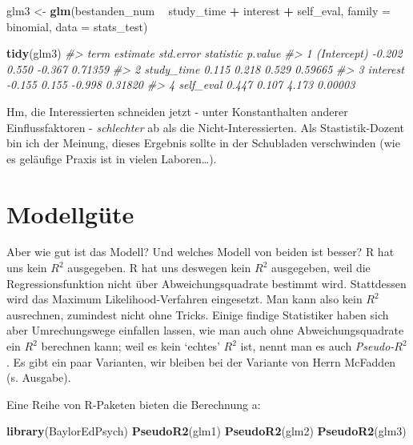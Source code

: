 \documentclass[12pt,ngerman,]{book}
\makeatletter
\newenvironment{Shaded}{\begin{snugshade}}{\end{snugshade}}
\newcommand{\KeywordTok}[1]{\textcolor[rgb]{0.13,0.29,0.53}{\textbf{#1}}}
\newcommand{\DataTypeTok}[1]{\textcolor[rgb]{0.13,0.29,0.53}{#1}}
\newcommand{\StringTok}[1]{\textcolor[rgb]{0.31,0.60,0.02}{#1}}
\newcommand{\CommentTok}[1]{\textcolor[rgb]{0.56,0.35,0.01}{\textit{#1}}}
\newcommand{\OperatorTok}[1]{\textcolor[rgb]{0.81,0.36,0.00}{\textbf{#1}}}
\newcommand{\NormalTok}[1]{#1}
\newenvironment{kframe}{%
\medskip{}
\setlength{\fboxsep}{.8em}
 \def\at@end@of@kframe{}%
 \ifinner\ifhmode%
  \def\at@end@of@kframe{\end{minipage}}%
  \begin{minipage}{\columnwidth}%
 \fi\fi%
 \def\FrameCommand##1{\hskip\@totalleftmargin \hskip-\fboxsep
 \colorbox{shadecolor}{##1}\hskip-\fboxsep
     \hskip-\linewidth \hskip-\@totalleftmargin \hskip\columnwidth}%
 \MakeFramed {\advance\hsize-\width
   \@totalleftmargin\z@ \linewidth\hsize
   \@setminipage}}%
 {\par\unskip\endMakeFramed%
 \at@end@of@kframe}
\renewenvironment{Shaded}{\begin{kframe}}{\end{kframe}}
\theoremstyle{definition}
\theoremstyle{definition}
\theoremstyle{remark}
\makeatother
\begin{document}
\begin{Shaded}
\begin{Highlighting}[]
\NormalTok{glm3 <-}\StringTok{ }\KeywordTok{glm}\NormalTok{(bestanden_num }\OperatorTok{~}\StringTok{ }\NormalTok{study_time }\OperatorTok{+}\StringTok{ }\NormalTok{interest }\OperatorTok{+}\StringTok{ }\NormalTok{self_eval, }
            \DataTypeTok{family =}\NormalTok{ binomial, }
            \DataTypeTok{data =}\NormalTok{ stats_test)}

\KeywordTok{tidy}\NormalTok{(glm3)}
\CommentTok{#>          term estimate std.error statistic p.value}
\CommentTok{#> 1 (Intercept)   -0.202     0.550    -0.367 0.71359}
\CommentTok{#> 2  study_time    0.115     0.218     0.529 0.59665}
\CommentTok{#> 3    interest   -0.155     0.155    -0.998 0.31820}
\CommentTok{#> 4   self_eval    0.447     0.107     4.173 0.00003}
\end{Highlighting}
\end{Shaded}

Hm, die Interessierten schneiden jetzt - unter Konstanthalten anderer
Einflussfaktoren - \emph{schlechter} ab als die Nicht-Interessierten.
Als Stastistik-Dozent bin ich der Meinung, dieses Ergebnis sollte in der
Schubladen verschwinden (wie es geläufige Praxis ist in vielen
Laboren\ldots{}).

\section{Modellgüte}\label{Modellguete}

Aber wie gut ist das Modell? Und welches Modell von beiden ist besser? R
hat uns kein \(R^2\) ausgegeben. R hat uns deswegen kein \(R^2\)
ausgegeben, weil die Regressionsfunktion nicht über Abweichungsquadrate
bestimmt wird. Stattdessen wird das Maximum Likelihood-Verfahren
eingesetzt. Man kann also kein \(R^2\) ausrechnen, zumindest nicht ohne
Tricks. Einige findige Statistiker haben sich aber Umrechungswege
einfallen lassen, wie man auch ohne Abweichungsquadrate ein \(R^2\)
berechnen kann; weil es kein `echtes' \(R^2\) ist, nennt man es auch
\emph{Pseudo-}\(R^2\). Es gibt ein paar Varianten, wir bleiben bei der
Variante von Herrn McFadden (s. Ausgabe).

Eine Reihe von R-Paketen bieten die Berechnung a:

\begin{Shaded}
\begin{Highlighting}[]
\KeywordTok{library}\NormalTok{(BaylorEdPsych)}
\KeywordTok{PseudoR2}\NormalTok{(glm1)}
\KeywordTok{PseudoR2}\NormalTok{(glm2)}
\KeywordTok{PseudoR2}\NormalTok{(glm3)}
\end{Highlighting}
\end{Shaded}
\end{document}
